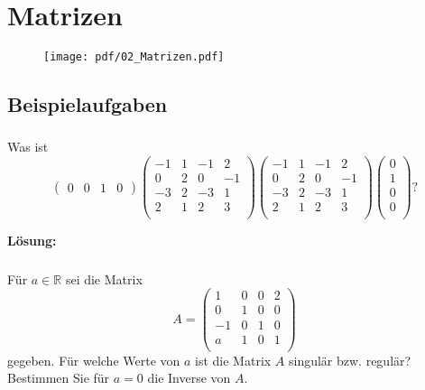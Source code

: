 \section{Matrizen}
\begin{figure}[h!]
    \texttt{[image: pdf/02\_Matrizen.pdf]}
\end{figure}
\newpage


\subsection{Beispielaufgaben} %
\vspace{1cm}
\subsubsection{}
Was ist
\[
\begin{pmatrix}
0 & 0 & 1 & 0
\end{pmatrix}
\begin{pmatrix}
-1 & 1 & -1 & 2 \\
0 & 2 & 0 & -1 \\
-3 & 2 & -3 & 1 \\
2 & 1 & 2 & 3 \\
\end{pmatrix}
\begin{pmatrix}
-1 & 1 & -1 & 2 \\
0 & 2 & 0 & -1 \\
-3 & 2 & -3 & 1 \\
2 & 1 & 2 & 3 \\
\end{pmatrix}
\begin{pmatrix}
0\\
1\\
0\\
0\\
\end{pmatrix}?
\]

\textbf{Lösung:}

\newpage
\subsubsection{} %
Für $a \in \mathbb{R}$  sei die Matrix
\[
A = \begin{pmatrix}
1 & 0 & 0 & 2 \\
0 & 1 & 0 & 0 \\
-1 & 0 & 1 & 0 \\
a & 1 & 0 & 1 \\
\end{pmatrix}
\]
gegeben. Für welche Werte von $a$ ist die Matrix $A$ singulär bzw. regulär? Bestimmen Sie für $a = 0$ die Inverse von $A$. \\

